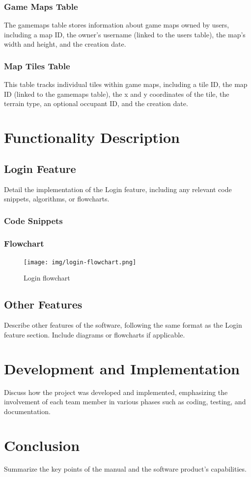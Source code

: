\documentclass[12pt]{article}
\begin{document}
\subsubsection{Game Maps Table}
The game\textunderscore maps table stores information about game maps owned by users, including a map ID, the owner's username (linked to the users table), the map's width and height, and the creation date.

\subsubsection{Map Tiles Table}
This table tracks individual tiles within game maps, including a tile ID, the map ID (linked to the game\textunderscore maps table), the x and y coordinates of the tile, the terrain type, an optional occupant ID, and the creation date.

\section{Functionality Description}
\subsection{Login Feature}
Detail the implementation of the Login feature, including any relevant code snippets, algorithms, or flowcharts.
\subsubsection{Code Snippets}
\subsubsection{Flowchart}
\begin{figure}[H]
 \centering
 \texttt{[image: img/login-flowchart.png]}
 \caption{Login flowchart}
\end{figure}

\subsection{Other Features}
Describe other features of the software, following the same format as the Login feature section. Include diagrams or flowcharts if applicable.

\section{Development and Implementation}
Discuss how the project was developed and implemented, emphasizing the involvement of each team member in various phases such as coding, testing, and documentation.

\section{Conclusion}
Summarize the key points of the manual and the software product's capabilities.
\end{document}
